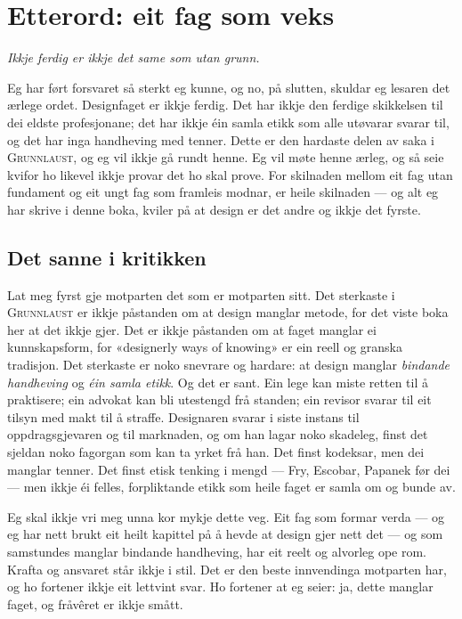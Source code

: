 \chapter*{Etterord: eit fag som veks}

\begin{center}\itshape
Ikkje ferdig er ikkje det same som utan grunn.
\end{center}
\vspace{8mm}

Eg har ført forsvaret så sterkt eg kunne, og no, på slutten, skuldar eg lesaren det ærlege ordet. Designfaget er ikkje ferdig. Det har ikkje den ferdige skikkelsen til dei eldste profesjonane; det har ikkje éin samla etikk som alle utøvarar svarar til, og det har inga handheving med tenner. Dette er den hardaste delen av saka i \textsc{Grunnlaust}, og eg vil ikkje gå rundt henne. Eg vil møte henne ærleg, og så seie kvifor ho likevel ikkje provar det ho skal prove. For skilnaden mellom eit fag utan fundament og eit ungt fag som framleis modnar, er heile skilnaden — og alt eg har skrive i denne boka, kviler på at design er det andre og ikkje det fyrste.

\section{Det sanne i kritikken}

Lat meg fyrst gje motparten det som er motparten sitt. Det sterkaste i \textsc{Grunnlaust} er ikkje påstanden om at design manglar metode, for det viste boka her at det ikkje gjer. Det er ikkje påstanden om at faget manglar ei kunnskapsform, for «designerly ways of knowing» er ein reell og granska tradisjon. Det sterkaste er noko snevrare og hardare: at design manglar \emph{bindande handheving} og \emph{éin samla etikk}. Og det er sant. Ein lege kan miste retten til å praktisere; ein advokat kan bli utestengd frå standen; ein revisor svarar til eit tilsyn med makt til å straffe. Designaren svarar i siste instans til oppdragsgjevaren og til marknaden, og om han lagar noko skadeleg, finst det sjeldan noko fagorgan som kan ta yrket frå han. Det finst kodeksar, men dei manglar tenner. Det finst etisk tenking i mengd — Fry, Escobar, Papanek før dei — men ikkje éi felles, forpliktande etikk som heile faget er samla om og bunde av.

Eg skal ikkje vri meg unna kor mykje dette veg. Eit fag som formar verda — og eg har nett brukt eit heilt kapittel på å hevde at design gjer nett det — og som samstundes manglar bindande handheving, har eit reelt og alvorleg ope rom. Krafta og ansvaret står ikkje i stil. Det er den beste innvendinga motparten har, og ho fortener ikkje eit lettvint svar. Ho fortener at eg seier: ja, dette manglar faget, og fråvêret er ikkje smått.

